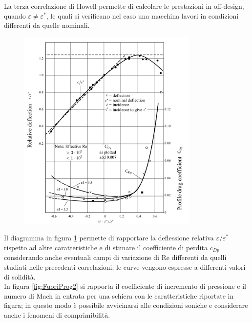 La terza correlazione di Howell permette di calcolare le prestazioni in off-design, quando $\varepsilon \neq \varepsilon^*$, le quali si verificano nel caso una macchina lavori in condizioni differenti da quelle nominali.
\begin{figure}
\centering
  \includegraphics[width=0.8\textwidth]{fig/FuoriProg1.pdf}
\caption{}
\label{fig:FuoriProg1}
\end{figure}
Il diagramma in figura \ref{fig:FuoriProg1} permette di rapportare la deflessione relativa $\varepsilon/\varepsilon^*$ rispetto ad altre caratteristiche e di stimare il coefficiente di perdita $c_{Dp}$ considerando anche eventuali campi di variazione di Re differenti da quelli studiati nelle precedenti correlazioni; le curve vengono espresse a differenti valori di solidità.\\
In figura \ref{fig:FuoriProg2} si rapporta il coefficiente di incremento di pressione e il numero di Mach in entrata per una schiera con le caratteristiche riportate in figura; in questo modo è possibile avvicinarsi alle condizioni soniche e considerare anche i fenomeni di comprimibilità.
